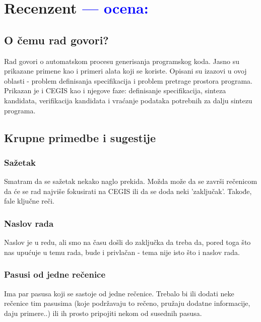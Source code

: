 \documentclass[a4paper]{report}
\newcommand{\odgovor}[1]{\textcolor{blue}{#1}}
\begin{document}
\chapter{Recenzent \odgovor{--- ocena:} }


\section{O čemu rad govori?}
Rad govori o automatskom procesu generisanja programskog koda. Jasno su prikazane primene kao i primeri alata koji se koriste. Opisani su izazovi u ovoj oblasti - problem definisanja specifikacija i problem pretrage prostora programa. Prikazan je i CEGIS kao i njegove faze: definisanje specifikacija, sinteza kandidata, verifikacija kandidata i vraćanje podataka potrebnih za dalju sintezu programa.


\section{Krupne primedbe i sugestije}


\subsection{Sažetak}

Smatram da se sažetak nekako naglo prekida. Možda može da se završi rečenicom da će se rad najviše fokusirati na CEGIS ili da se doda neki 'zaključak'. Takođe, fale ključne reči.



\subsection{Naslov rada}
Naslov je u redu, ali smo na času došli do zaključka da treba da, pored toga što nas upućuje u temu rada, bude i privlačan - tema nije isto što i naslov rada.



\subsection{Pasusi od jedne rečenice}
Ima par pasusa koji se sastoje od jedne rečenice. Trebalo bi ili dodati neke rečenice tim pasusima (koje podržavaju to rečeno, pružaju dodatne informacije, daju primere..) ili ih prosto pripojiti nekom od susednih pasusa.
\end{document}
